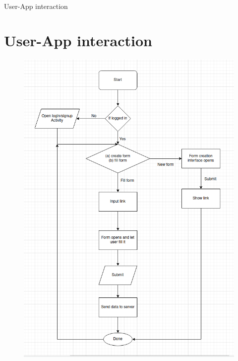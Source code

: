 \documentclass{beamer}
\begin{document}
    \begin{frame}{User-App interaction}
        \section{User-App interaction}
        \begin{figure}
            \includegraphics[width=0.45\columnwidth]{images/AppWorking.png}
        \end{figure}
    \end{frame}
\end{document}
